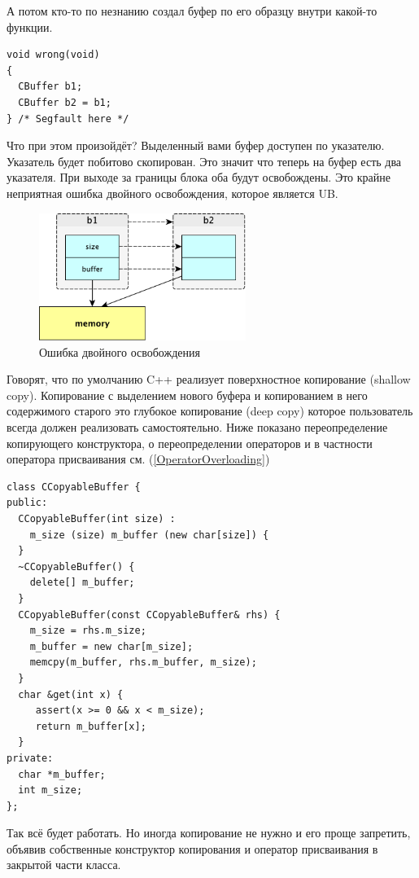 \documentclass[a4paper,12pt,oneside]{article}
\begin{document}
А потом кто-то по незнанию создал буфер по его образцу внутри какой-то функции.

\begin{lstlisting}
void wrong(void)
{
  CBuffer b1;
  CBuffer b2 = b1;
} /* Segfault here */
\end{lstlisting}

Что при этом произойдёт? Выделенный вами буфер доступен по указателю. Указатель будет побитово скопирован. Это значит что теперь на буфер есть два указателя. При выходе за границы блока оба будут освобождены. Это крайне неприятная ошибка двойного освобождения, которое является UB.

\begin{figure}[h!]
\centering
\includegraphics[width=0.6\textwidth]{illustrations/copying-crop.pdf}
\caption{Ошибка двойного освобождения}
\label{fig:copying-crop}
\end{figure}

Говорят, что по умолчанию C++ реализует поверхностное копирование (shallow copy). Копирование с выделением нового буфера и копированием в него содержимого старого это глубокое копирование (deep copy) которое пользователь всегда должен реализовать самостоятельно. Ниже показано переопределение копирующего конструктора, о переопределении операторов и в частности оператора присваивания см. (\ref{OperatorOverloading})

\begin{lstlisting}
class CCopyableBuffer {
public:
  CCopyableBuffer(int size) : 
    m_size (size) m_buffer (new char[size]) {
  }
  ~CCopyableBuffer() { 
    delete[] m_buffer; 
  }
  CCopyableBuffer(const CCopyableBuffer& rhs) { 
    m_size = rhs.m_size; 
    m_buffer = new char[m_size];
    memcpy(m_buffer, rhs.m_buffer, m_size);
  } 
  char &get(int x) { 
     assert(x >= 0 && x < m_size); 
     return m_buffer[x]; 
  } 
private:
  char *m_buffer;
  int m_size;
};
\end{lstlisting}

Так всё будет работать. Но иногда копирование не нужно и его проще запретить, объявив собственные конструктор копирования и оператор присваивания в закрытой части класса.
\end{document}

